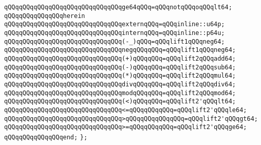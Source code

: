 \verb|qQQqqQQqqQQqqQQqqQQqqQQqqQQqqQQqge64qQQq=qQQqnotqQQqoqQQqlt64;|\newline
\newline
\verb|qQQqqQQqqQQqqQQqherein|\newline
\newline
\verb|qQQqqQQqqQQqqQQqqQQqqQQqqQQqqQQqexternqQQq=qQQqinline::u64p;|\newline
\verb|qQQqqQQqqQQqqQQqqQQqqQQqqQQqqQQqinternqQQq=qQQqinline::p64u;|\newline
\newline
\verb|qQQqqQQqqQQqqQQqqQQqqQQqqQQqqQQq(-_)qQQq=qQQqlift1qQQqneg64;|\newline
\verb|qQQqqQQqqQQqqQQqqQQqqQQqqQQqqQQqnegqQQqqQQq=qQQqlift1qQQqneg64;|\newline
\newline
\verb|qQQqqQQqqQQqqQQqqQQqqQQqqQQqqQQq(+)qQQqqQQq=qQQqlift2qQQqadd64;|\newline
\verb|qQQqqQQqqQQqqQQqqQQqqQQqqQQqqQQq(-)qQQqqQQq=qQQqlift2qQQqsub64;|\newline
\verb|qQQqqQQqqQQqqQQqqQQqqQQqqQQqqQQq(*)qQQqqQQq=qQQqlift2qQQqmul64;|\newline
\verb|qQQqqQQqqQQqqQQqqQQqqQQqqQQqqQQqdivqQQqqQQq=qQQqlift2qQQqdiv64;|\newline
\newline
\verb|qQQqqQQqqQQqqQQqqQQqqQQqqQQqqQQqmodqQQqqQQq=qQQqlift2qQQqmod64;|\newline
\newline
\verb|qQQqqQQqqQQqqQQqqQQqqQQqqQQqqQQq(<)qQQqqQQq=qQQqlift2'qQQqlt64;|\newline
\verb|qQQqqQQqqQQqqQQqqQQqqQQqqQQqqQQq<=qQQqqQQqqQQq=qQQqlift2'qQQqle64;|\newline
\verb|qQQqqQQqqQQqqQQqqQQqqQQqqQQqqQQq>qQQqqQQqqQQqqQQq=qQQqlift2'qQQqgt64;|\newline
\verb|qQQqqQQqqQQqqQQqqQQqqQQqqQQqqQQq>=qQQqqQQqqQQq=qQQqlift2'qQQqge64;|\newline
\verb|qQQqqQQqqQQqqQQqend;|\newline
\verb|};|\newline
\newline

